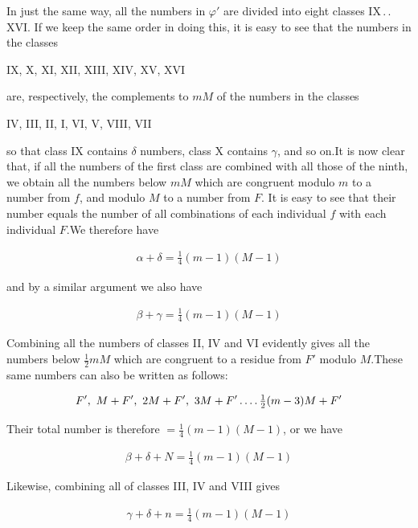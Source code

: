 In just the same way, all the numbers in $\varphi'$ are divided into eight classes IX\,.\,.\,XVI. If we keep the same order in doing this, it is easy to see that the numbers in the classes

\begin{center}IX, X, XI, XII, XIII, XIV, XV, XVI\end{center}

are, respectively, the complements to $mM$ of the numbers in the classes

\begin{center}IV, III, II, I, VI, V, VIII, VII\end{center}

so that class IX contains $\delta$ numbers, class X contains $\gamma$, and so on.\quad It is now clear that, if all the numbers of the first class are combined with all those of the ninth, we obtain all the numbers below $mM$ which are congruent modulo $m$ to a number from $f$, and modulo $M$ to a number from $F$. It is easy to see that their number equals the number of all combinations of each individual $f$ with each individual $F$.\quad We therefore have

\[
\begin{aligned}
\alpha+\delta=\tfrac14(m-1)(M-1)
\end{aligned}
\]

and by a similar argument we also have

\[
\begin{aligned}
\beta+\gamma=\tfrac14(m-1)(M-1)
\end{aligned}
\]

Combining all the numbers of classes II, IV and VI evidently gives all the numbers below $\frac12mM$ which are congruent to a residue from $F'$ modulo $M$.\quad These same numbers can also be written as follows:

\[
\begin{aligned}
F',\ M+F',\ 2M+F',\ 3M+F'\mathinner{.\,.\,.\,.}\tfrac12(m-3)M+F'
\end{aligned}
\]

Their total number is therefore $=\frac14(m-1)(M-1)$, or we have

\[
\begin{aligned}
\beta+\delta+N=\tfrac14(m-1)(M-1)
\end{aligned}
\]

Likewise, combining all of classes III, IV and VIII gives

\[
\begin{aligned}
\gamma+\delta+n=\tfrac14(m-1)(M-1)
\end{aligned}
\]

